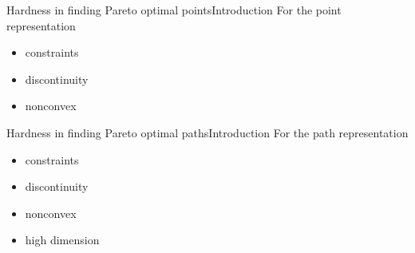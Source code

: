 \begin{frame}{Hardness in finding Pareto optimal points}{Introduction}
For the point representation
\begin{itemize}
\item constraints
\item discontinuity
\item nonconvex
\end{itemize}
\end{frame}

\begin{frame}{Hardness in finding Pareto optimal paths}{Introduction}
For the path representation
\begin{itemize}
\item constraints
\item discontinuity
\item nonconvex
\item high dimension
\end{itemize}
\end{frame}